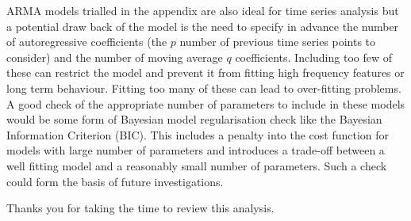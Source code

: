 \documentclass[10pt]{article}
\begin{document}
ARMA models trialled in the appendix are also ideal for time series analysis but a potential draw back of the model is the need to specify in advance the number of autoregressive coefficients (the $p$ number of previous time series points to consider) and the number of moving average $q$ coefficients. Including too few of these can restrict the model and prevent it from fitting high frequency features or long term behaviour. Fitting too many of these can lead to over-fitting problems. A good check of the appropriate number of parameters to include in these models would be some form of Bayesian model regularisation check like the Bayesian Information Criterion (BIC). This includes a penalty into the cost function for models with large number of parameters and introduces a trade-off between a well fitting model and a reasonably small number of parameters. Such a check could form the basis of future investigations.

Thanks you for taking the time to review this analysis. 
\end{document}
